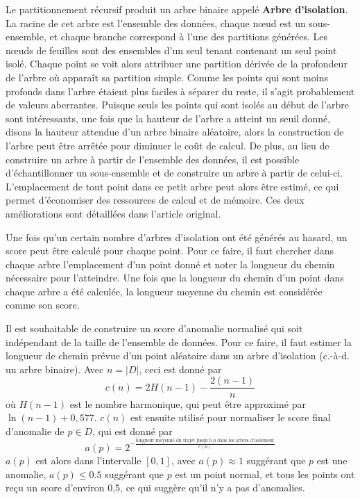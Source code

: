Le partitionnement récursif produit un arbre binaire appelé \textbf{Arbre d'isolation}.
La racine de cet arbre est l'ensemble des données, 
chaque nœud est un sous-ensemble,
et chaque branche correspond à l'une des partitions générées.
Les nœuds de feuilles sont des ensembles d'un seul tenant contenant un seul point isolé.
Chaque point se voit alors attribuer une partition dérivée de la profondeur de l'arbre où apparaît sa partition simple. Comme les points qui sont moins profonds dans l'arbre étaient plus faciles à séparer du reste, il s'agit probablement de valeurs aberrantes.
Puisque seuls les points qui sont isolés au début de l'arbre sont intéressants, une fois que la hauteur de l'arbre a atteint un seuil donné, disons la hauteur attendue d'un arbre binaire aléatoire, 
alors la construction de l'arbre peut être arrêtée pour diminuer le coût de calcul.
De plus, au lieu de construire un arbre à partir de l'ensemble des données, il est possible d'échantillonner un sous-ensemble et de construire un arbre à partir de celui-ci. L'emplacement de tout point dans ce petit arbre peut alors être estimé, ce qui permet d'économiser des ressources de calcul et de mémoire.
Ces deux améliorations sont détaillées dans l'article original.

Une fois qu'un certain nombre d'arbres d'isolation ont été générés au hasard, un score peut être calculé pour chaque point. Pour ce faire, il faut chercher dans chaque arbre l'emplacement d'un point donné et noter la longueur du chemin nécessaire pour l'atteindre.
Une fois que la longueur du chemin d'un point dans chaque arbre a été calculée, la longueur moyenne du chemin est considérée comme son score.

Il est souhaitable de construire un score d'anomalie normalisé qui soit indépendant de la taille de l'ensemble de données. Pour ce faire, il faut estimer la longueur de chemin prévue d'un point aléatoire dans un arbre d'isolation (c.-à-d. un arbre binaire).
Avec $n = |D|$, ceci est donné par
\[
c(n) 
= 2 H(n-1) - \frac{2(n-1)}{n}
\]
où $H(n-1)$ est le nombre harmonique, qui peut être approximé par $\ln(n-1) + 0,577$.
$c(n)$ est ensuite utilisé pour normaliser le score final d'anomalie de $p \in D$, qui est donné par
\[
a(p)
= 2^{-\frac{\text{longueur moyenne du trajet jusqu'à $p$ dans les arbres d'isolement}}{c(n)}}
\]
$a(p)$ est alors dans l'intervalle $[0,1]$, 
avec $a(p) \approx 1$ suggérant que $p$ est une anomalie, 
$a(p) \leq 0.5$ suggérant que $p$ est un point normal,
et tous les points ont reçu un score d'environ 0,5, ce qui suggère qu'il n'y a pas d'anomalies.

